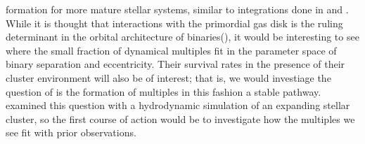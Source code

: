 \documentclass{aastex631}
\begin{document}
formation for more mature stellar systems, similar to integrations done in \cite{kro01} and \cite{moe10}. While it is thought that interactions with the primordial gas disk is the ruling
determinant in the orbital architecture of binaries(\cite{kro01,krobur01,bat00}), it would be interesting to see where the small fraction of 
dynamical multiples fit in the parameter space of binary separation and eccentricity. Their survival rates in the presence of their cluster environment will also 
be of interest; that is, we would investiage the question of is the formation of multiples in this fashion a stable pathway.\cite{moe10} examined this question with a hydrodynamic
simulation of an expanding stellar cluster, so the first course of action would be to investigate how the multiples we see fit with prior observations.


\end{document}
